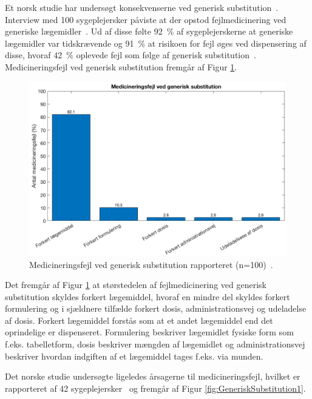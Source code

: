 Et norsk studie har undersøgt konsekvenserne ved generisk substitution~\citep{Hakonsen2010}. Interview med 100 sygeplejersker påviste at der opstod fejlmedicinering ved generiske lægemidler~\citep{Hakonsen2010}. Ud af disse følte 92~\% af sygeplejerskerne at generiske lægemidler var tidskrævende og 91~\% at risikoen for fejl øges ved dispensering af disse, hvoraf 42~\% oplevede fejl som følge af generisk substitution~\citep{Hakonsen2010}.
Medicineringsfejl ved generisk substitution fremgår af Figur \ref{fig:GeneriskSubstitution}.

\begin{figure}[H]\centering	\includegraphics[width=1\textwidth]{billeder/GenSub.png} 
	\caption{Medicineringsfejl ved generisk substitution rapporteret (n=100)~\citep{Hakonsen2010}.}
	\label{fig:GeneriskSubstitution}  
\end{figure}

Det fremgår af Figur \ref{fig:GeneriskSubstitution} at størstedelen af fejlmedicinering ved generisk substitution skyldes forkert lægemiddel, hvoraf en mindre del skyldes forkert formulering og i sjældnere tilfælde forkert dosis, administrationsvej og udeladelse af dosis. Forkert lægemiddel forstås som at et andet lægemiddel end det oprindelige er dispenseret. Formulering beskriver lægemidlet fysiske form som f.eks. tabelletform, dosis beskriver mængden af lægemidlet og administrationsvej beskriver hvordan indgiften af et lægemiddel tages f.eks. via munden.

Det norske studie undersøgte ligeledes årsagerne til medicineringsfejl, hvilket er rapporteret af 42 sygeplejersker~\citep{Hakonsen2010} og fremgår af Figur \ref{fig:GeneriskSubstitution1}.

